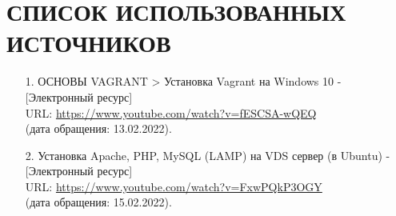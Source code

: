 \documentclass[12pt, a4paper, simple]{eskdtext}
\begin{document}
    \section*{СПИСОК ИСПОЛЬЗОВАННЫХ ИСТОЧНИКОВ}
    \begin{enumerate}
        \item[1.] ОСНОВЫ VAGRANT > Установка Vagrant на Windows 10 - [Электронный ресурс] \\
        URL: \url{https://www.youtube.com/watch?v=fESCSA-wQEQ}\\
        (дата обращения: 13.02.2022).
        \item[2.] Установка Apache, PHP, MySQL (LAMP) на VDS сервер (в Ubuntu) - [Электронный ресурс] \\
        URL: \url{https://www.youtube.com/watch?v=FxwPQkP3OGY}\\
        (дата обращения: 15.02.2022).
    \end{enumerate}
    \newpage
\end{document}
